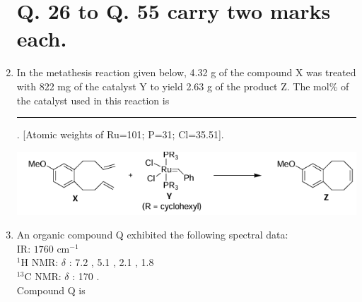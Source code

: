 \documentclass[journal,12pt,onecolumn]{IEEEtran}
\theoremstyle{remark}
\begin{document}
\begin{enumerate}
\begin{center}
\section*{Q. 26 to Q. 55 carry two marks each.}

\end{center}

\item In the metathesis reaction given below, 4.32 g of the compound X was treated with 822 mg of the catalyst Y to yield 2.63 g of the product Z. The mol\% of the catalyst used in this reaction is \rule{1cm}{0.15mm}. [Atomic weights of Ru=101; P=31; Cl=35.51].
    \begin{center}
       
        \includegraphics[width=0.8\columnwidth]{figs/q26.png}
    \end{center}
    \hfill{}



\item An organic compound Q exhibited the following spectral data: \\
IR: $1760 \text{ cm}^{-1}$ \\
$^1$H NMR: $\delta$ : 7.2 , 5.1 , 2.1 , 1.8  \\
$^{13}$C NMR: $\delta$ : 170 . \\
Compound Q is
    \begin{enumerate}
        \begin{multicols}{2}
        

\end{multicols}
\end{enumerate}
\end{enumerate}
\end{document}

